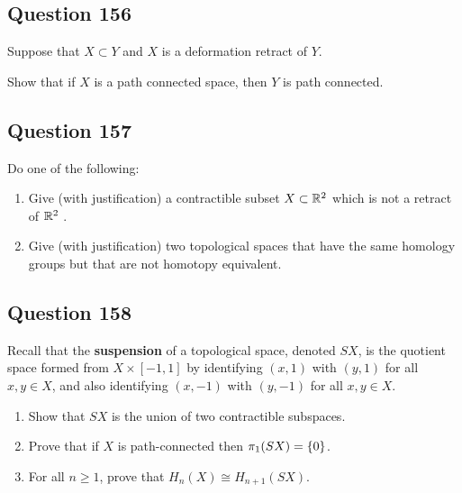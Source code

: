 \documentclass[12pt]{article}
\begin{document}
\hypertarget{question-156}{%
\subsection{Question 156}\label{question-156}}

Suppose that \(X \subset Y\) and \(X\) is a deformation retract of
\(Y\).

Show that if \(X\) is a path connected space, then \(Y\) is path
connected.

\hypertarget{question-157}{%
\subsection{Question 157}\label{question-157}}

Do one of the following:

\begin{enumerate}
\def\labelenumi{\alph{enumi}.}
\item
  Give (with justification) a contractible subset \(X \subset {\mathbb{R}}^2\)
  which is not a retract of \({\mathbb{R}}^2\) .
\item
  Give (with justification) two topological spaces that have the same
  homology groups but that are not homotopy equivalent.
\end{enumerate}

\hypertarget{question-158}{%
\subsection{Question 158}\label{question-158}}

Recall that the \textbf{suspension} of a topological space, denoted
\(SX\), is the quotient space formed from \(X \times [-1, 1]\) by
identifying \((x, 1)\) with \((y, 1)\) for all \(x, y \in X\), and also
identifying \((x, -1)\) with \((y, -1)\) for all \(x, y \in X\).

\begin{enumerate}
\def\labelenumi{\alph{enumi}.}
\item
  Show that \(SX\) is the union of two contractible subspaces.
\item
  Prove that if \(X\) is path-connected then
  \(\pi_1 (SX) = \left\{{0}\right\}\).
\item
  For all \(n \geq 1\), prove that \(H_{n} (X) \cong H_{n+1} (SX)\).
\end{enumerate}
\end{document}
